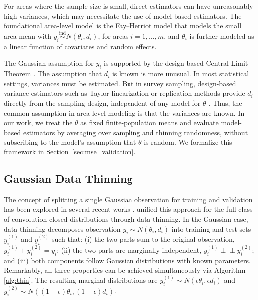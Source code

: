 \documentclass[11pt]{article}
\newcommand{\indep}{\perp\!\!\!\!\perp}
\newcommand{\iid}{\stackrel{\text{iid}}{\sim}}
\newcommand{\ind}{\stackrel{\text{ind}}{\sim}}
\newcommand{\ytrain}{y^{(1)}}                           %
\newcommand{\ytest}{y^{(2)}}                            %
\newcommand{\N}[2]{N\!\left(#1, #2\right)}
\theoremstyle{plain}
\theoremstyle{definition}
\theoremstyle{remark}
\begin{document}
For areas where the sample size is small, direct estimators can have unreasonably high variances, which may necessitate the use of model-based estimators. The foundational area-level model is the Fay--Herriot model  \citep{fay_estimates_1979}  that models the small area mean with  $y_i \ind \N{\theta_i}{d_i}$,
for areas $i=1, \ldots, m$, and $\theta_i$ is further modeled as a linear function of covariates and random effects.

The Gaussian assumption for $y_i$ is supported by the design-based Central Limit Theorem \citep{hajek_asymptotic_1964}. The assumption that $d_i$ is known is more unusual. In most statistical settings, variances must be estimated. But in survey sampling, design-based variance estimators such as Taylor linearization or replication methods provide $d_i$ directly from the sampling design, independent of any model for $\theta$ \citep{lohr_sampling_1999}. Thus, the common assumption in area-level modeling is that the variances are known. In our work, we treat the $\theta$ as fixed finite-population means and evaluate model-based estimators by averaging over sampling and thinning randomness, without subscribing to the model's assumption that $\theta$ is random. We formalize this framework in Section~\ref{sec:mse_validation}.



\subsection{Gaussian Data Thinning} \label{sec:dt_background}

The concept of splitting a single Gaussian observation for training
and validation has been explored in several recent works \citep{rasines_splitting_2023, oliveira_unbiased_2024, leiner_data_2025}.
\citet{neufeld_data_2024} unified this approach for the full class
of convolution-closed distributions through data thinning.
In the Gaussian case, data thinning decomposes observation $y_i \sim \N{\theta_i}{d_i}$ into training and test sets $\ytrain_i$ and $\ytest_i$ such that: (i) the two parts sum to the original observation, $\ytrain_i + \ytest_i = y_i$; (ii) the two parts are marginally independent, $\ytrain_i \indep \ytest_i$; and (iii) both components follow Gaussian distributions with known parameters. Remarkably, all three properties can be achieved simultaneously via Algorithm \ref{alg:thin}. The resulting marginal distributions are $\ytrain_i \sim \N{\epsilon \theta_i}{\epsilon d_i}$ and $\ytest_i \sim \N{(1-\epsilon)\theta_i}{(1-\epsilon)d_i}$.
\end{document}
